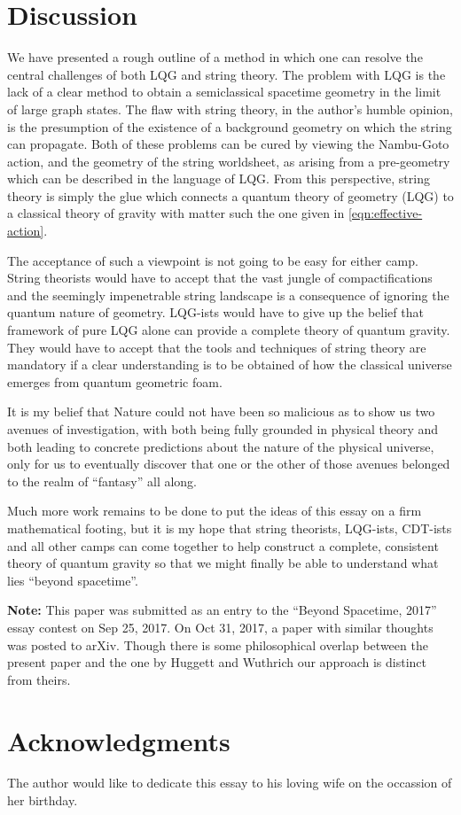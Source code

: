 \documentclass[11pt,a4paper,nofootinbib]{revtex4-1}
\begin{document}
\section{Discussion}\label{sec:discussion}

We have presented a rough outline of a method in which one can resolve the central challenges of both LQG and string theory. The problem with LQG is the lack of a clear method to obtain a semiclassical spacetime geometry in the limit of large graph states. The flaw with string theory, in the author's humble opinion, is the presumption of the existence of a background geometry on which the string can propagate. Both of these problems can be cured by viewing the Nambu-Goto action, and the geometry of the string worldsheet, as arising from a pre-geometry which can be described in the language of LQG. From this perspective, string theory is simply the glue which connects a quantum theory of geometry (LQG) to a classical theory of gravity with matter such the one given in \eqref{eqn:effective-action}.

The acceptance of such a viewpoint is not going to be easy for either camp. String theorists would have to accept that the vast jungle of compactifications and the seemingly impenetrable string landscape is a consequence of ignoring the quantum nature of geometry. LQG-ists would have to give up the belief that framework of pure LQG alone can provide a complete theory of quantum gravity. They would have to accept that the tools and techniques of string theory are mandatory if a clear understanding is to be obtained of how the classical universe emerges from quantum geometric foam.

It is my belief that Nature could not have been so malicious as to show us two avenues of investigation, with both being fully grounded in physical theory and both leading to concrete predictions about the nature of the physical universe, only for us to eventually discover that one or the other of those avenues belonged to the realm of ``fantasy'' all along.

Much more work remains to be done to put the ideas of this essay on a firm mathematical footing, but it is my hope that string theorists, LQG-ists, CDT-ists and all other camps can come together to help construct a complete, consistent theory of quantum gravity so that we might finally be able to understand what lies ``beyond spacetime''.

\textbf{Note:} This paper was submitted as an entry to the ``Beyond Spacetime, 2017'' essay contest on Sep 25, 2017. On Oct 31, 2017, a paper \cite{Huggett2017The-Atemporal} with similar thoughts was posted to arXiv. Though there is some philosophical overlap between the present paper and the one by Huggett and Wuthrich our approach is distinct from theirs.

\section*{Acknowledgments}

The author would like to dedicate this essay to his loving wife on the occassion of her birthday.




\end{document}
